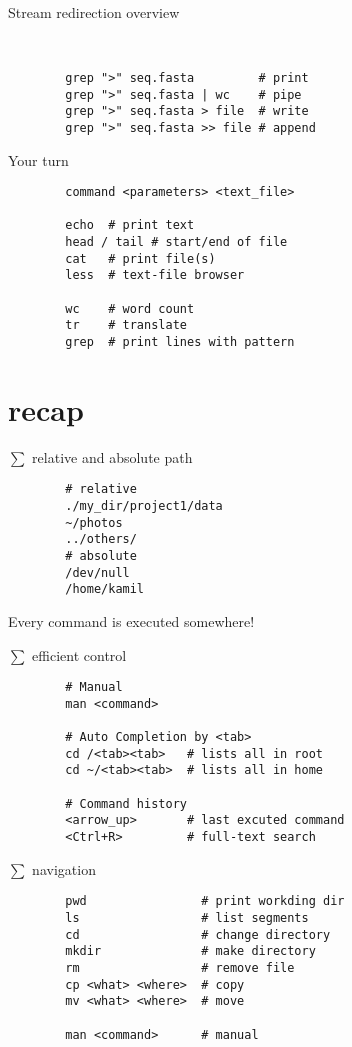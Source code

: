 \documentclass[xcolor=dvipsnames]{beamer}
\begin{document}
\begin{frame}[fragile]
	\huge
	Stream redirection overview
	\Large
	\begin{verbatim}


		grep ">" seq.fasta         # print
		grep ">" seq.fasta | wc    # pipe
		grep ">" seq.fasta > file  # write
		grep ">" seq.fasta >> file # append
	\end{verbatim}
\end{frame}

\begin{frame}[fragile]
	\huge
	Your turn
	\Large
	\begin{verbatim}
		command <parameters> <text_file>

		echo  # print text
		head / tail # start/end of file
		cat   # print file(s)
		less  # text-file browser

		wc    # word count
		tr    # translate
		grep  # print lines with pattern
	\end{verbatim}
\end{frame}

\section{recap}

\begin{frame}[fragile]
	$\sum$ relative and absolute path
	\Large
	\begin{verbatim}
		# relative
		./my_dir/project1/data
		~/photos
		../others/
		# absolute
		/dev/null
		/home/kamil
	\end{verbatim}
	Every command is executed somewhere!
\end{frame}

\begin{frame}[fragile]
	$\sum$ efficient control
	\Large
	\begin{verbatim}
		# Manual
		man <command>

		# Auto Completion by <tab>
		cd /<tab><tab>   # lists all in root
		cd ~/<tab><tab>  # lists all in home

		# Command history
		<arrow_up>       # last excuted command
		<Ctrl+R>         # full-text search
	\end{verbatim}
\end{frame}

\begin{frame}[fragile]
	$\sum$ navigation
	\Large
	\begin{verbatim}
		pwd                # print workding dir
		ls                 # list segments
		cd                 # change directory
		mkdir              # make directory
		rm                 # remove file
		cp <what> <where>  # copy
		mv <what> <where>  # move

		man <command>      # manual
	\end{verbatim}
\end{frame}
\end{document}
